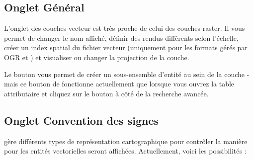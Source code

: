 \subsection{Onglet Général}\label{vectorgeneraltab}
L'onglet  des couches vecteur est très proche de celui des couches raster. Il vous permet de changer le nom affiché, définir des rendus différents selon l'échelle, créer un index spatial du fichier vecteur (uniquement pour les formats gérés par OGR et \pg) et visualiser ou changer la projection de la couche.

Le bouton  vous permet de créer un sous-ensemble d'entité au sein de la couche - mais ce bouton de fonctionne actuellement que lorsque vous ouvrez la table attributaire et cliquez sur le bouton \button{\dots} à côté de la recherche avancée.

\subsection{Onglet Convention des signes}\label{sec:symbology}

\qg gère différents types de représentation cartographique pour contrôler la manière pour les entités vectorielles seront affichées. Actuellement, voici les possibilités :


